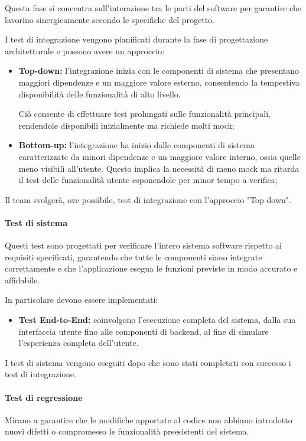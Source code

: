 Questa fase si concentra sull'interazione tra le parti del software per garantire che lavorino sinergicamente secondo le specifiche del progetto.

I test di integrazione vengono pianificati durante la fase di progettazione architetturale e possono avere un approccio:

\begin{itemize}
    \item \textbf{Top-down:}
        l'integrazione inizia con le componenti di sistema che presentano maggiori dipendenze e un maggiore valore esterno, consentendo la tempestiva disponibilità delle funzionalità di alto livello.

        Ciò consente di effettuare test prolungati sulle funzionalità principali, rendendole disponibili inizialmente ma richiede molti mock;
    \item \textbf{Bottom-up:}
        l'integrazione ha inizio dalle componenti di sistema caratterizzate da minori dipendenze e un maggiore valore interno, ossia quelle meno visibili all'utente. Questo implica la necessità di meno mock ma ritarda il test delle funzionalità utente esponendole per minor tempo a verifica;
\end{itemize}

Il team svolgerà, ove possibile, test di integrazione con l'approccio "Top down".

\paragraph{Test di sistema}
Questi test sono progettati per verificare l'intero sistema software rispetto ai requisiti specificati, garantendo che tutte le componenti siano integrate correttamente e che l'applicazione esegua le funzioni previste in modo accurato e affidabile.

In particolare devono essere implementati:
\begin{itemize}
    \item  \textbf{Test End-to-End:} 
        coinvolgono l'esecuzione completa del sistema, dalla sua interfaccia utente fino alle componenti di backend, al fine di simulare l'esperienza completa dell'utente.
\end{itemize}

I test di sistema vengono eseguiti dopo che sono stati completati con successo i test di integrazione.

\paragraph{Test di regressione}
Mirano a garantire che le modifiche apportate al codice non abbiano introdotto nuovi difetti o compromesso le funzionalità preesistenti del sistema.

